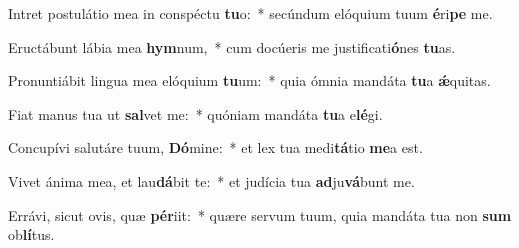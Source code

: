 \item Intret postulátio mea in conspéctu \textbf{tu}o:~* secúndum elóquium tuum \textbf{é}ri\textbf{pe} me.
\item Eructábunt lábia mea \textbf{hym}num,~* cum docúeris me justificati\textbf{ó}nes \textbf{tu}as.
\item Pronuntiábit lingua mea elóquium \textbf{tu}um:~* quia ómnia mandáta \textbf{tu}a \textbf{ǽ}quitas.
\item Fiat manus tua ut \textbf{sal}vet me:~* quóniam mandáta \textbf{tu}a e\textbf{lé}gi.
\item Concupívi salutáre tuum, \textbf{Dó}mine:~* et lex tua medi\textbf{tá}tio \textbf{me}a est.
\item Vivet ánima mea, et lau\textbf{dá}bit te:~* et judícia tua \textbf{ad}ju\textbf{vá}bunt me.
\item Errávi, sicut ovis, quæ \textbf{pér}iit:~* quære servum tuum, quia mandáta tua non \textbf{sum} ob\textbf{lí}tus.
